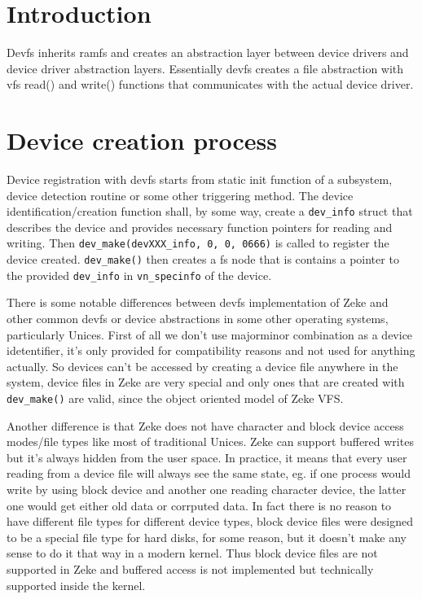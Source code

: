 \section{Introduction}

Devfs inherits ramfs and creates an abstraction layer between device drivers
and device driver abstraction layers. Essentially devfs creates a file
abstraction with vfs read() and write() functions that communicates with the
actual device driver.

\section{Device creation process}

Device registration with devfs starts from static init function of a subsystem,
device detection routine or some other triggering method. The device
identification/creation function shall, by some way, create a \verb+dev_info+
struct that describes the device and provides necessary function pointers for
reading and writing. Then \verb+dev_make(devXXX_info, 0, 0, 0666)+ is called
to register the device created. \verb+dev_make()+ then creates a fs node that is
contains a pointer to the provided \verb+dev_info+ in \verb+vn_specinfo+ of the
device.

There is some notable differences between devfs implementation of Zeke and other
common devfs or device abstractions in some other operating systems,
particularly Unices. First of all we don't use majorminor combination as a
device idetentifier, it's only provided for compatibility reasons and not used
for anything actually. So devices can't be accessed by creating a device file
anywhere in the system, device files in Zeke are very special and only ones that
are created with \verb+dev_make()+ are valid, since the object oriented model of
Zeke VFS.

Another difference is that Zeke does not have character and block device
access modes/file types like most of traditional Unices. Zeke can support
buffered writes but it's always hidden from the user space. In practice,
it means that every user reading from a device file will always see the
same state, eg. if one process would write by using block device and another
one reading character device, the latter one would get either old data or
corrputed data. In fact there is no reason to have different file types for
different device types, block device files were designed to be a special file
type for hard disks, for some reason, but it doesn't make any sense to do it
that way in a modern kernel.\cite{Kamp:rethinkdev} Thus block device files are
not supported in Zeke and buffered access is not implemented but technically
supported inside the kernel.

